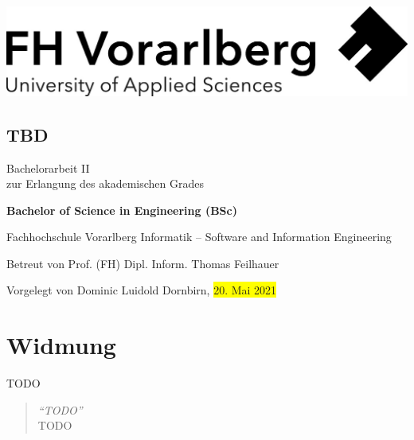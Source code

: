\documentclass[a4paper,12pt,twoside]{scrreprt}
\begin{document}
\onehalfspacing %

\cleardoublepage %
\thispagestyle{empty}
\begin{titlepage}
    \begin{flushright}
    \includegraphics[width=0.4\linewidth]{images/Logo_FHV.jpg}
    \end{flushright}
    \begin{flushleft}
    \section*{TBD}
    \vspace{1cm}

    Bachelorarbeit II\\
    zur Erlangung des akademischen Grades
    \vspace{0.5cm}

    \textbf{Bachelor of Science in Engineering (BSc)}

    \vspace{1cm}
    Fachhochschule Vorarlberg\newline
    Informatik – Software and Information Engineering

    \vspace{0.5cm}

    Betreut von\newline
    Prof. (FH) Dipl. Inform. Thomas Feilhauer

    \vspace{0.5cm}

    Vorgelegt von\newline
    Dominic Luidold\newline
    Dornbirn, \colorbox{yellow}{20. Mai 2021}
    \end{flushleft}
\end{titlepage}

\newpage
\section*{Widmung}
\label{sec:widmung}
TODO

\bigskip

\begin{quote}
    \begin{flushright}
        \textit{\enquote{TODO}}\\
        TODO
    \end{flushright}
\end{quote}
\end{document}
